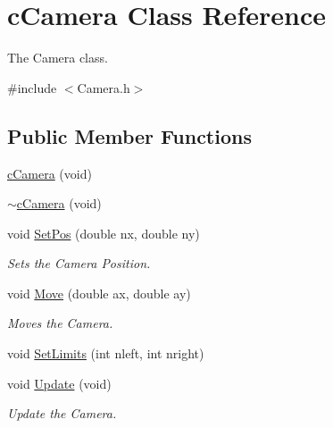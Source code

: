 \hypertarget{classc_camera}{\section{c\-Camera Class Reference}
\label{classc_camera}
}


The Camera class.  




{\ttfamily \#include $<$Camera.\-h$>$}

\subsection*{Public Member Functions}
\begin{DoxyCompactItemize}
\item 
\hyperlink{classc_camera_a1ef5879e7bd5c896ca1d2a3b00f48055}{c\-Camera} (void)
\item 
\hyperlink{classc_camera_ad6b44d53fe5ee0b65d2c1a74e6ae27a9}{$\sim$c\-Camera} (void)
\item 
void \hyperlink{classc_camera_aeb6f3d85a5cd1e57d37f9ffe15dfd5b8}{Set\-Pos} (double nx, double ny)
\begin{DoxyCompactList}\small\item\em Sets the Camera Position. \end{DoxyCompactList}\item 
void \hyperlink{classc_camera_ac5f6fa72fab83344d26dc27886a5cdd1}{Move} (double ax, double ay)
\begin{DoxyCompactList}\small\item\em Moves the Camera. \end{DoxyCompactList}\item 
void \hyperlink{classc_camera_a57649fcc3a2153b305b280e766fdfae2}{Set\-Limits} (int nleft, int nright)
\item 
void \hyperlink{classc_camera_af833211717b296a7ae641bc54640f41b}{Update} (void)
\begin{DoxyCompactList}\small\item\em Update the Camera. \end{DoxyCompactList}\end{DoxyCompactItemize}
